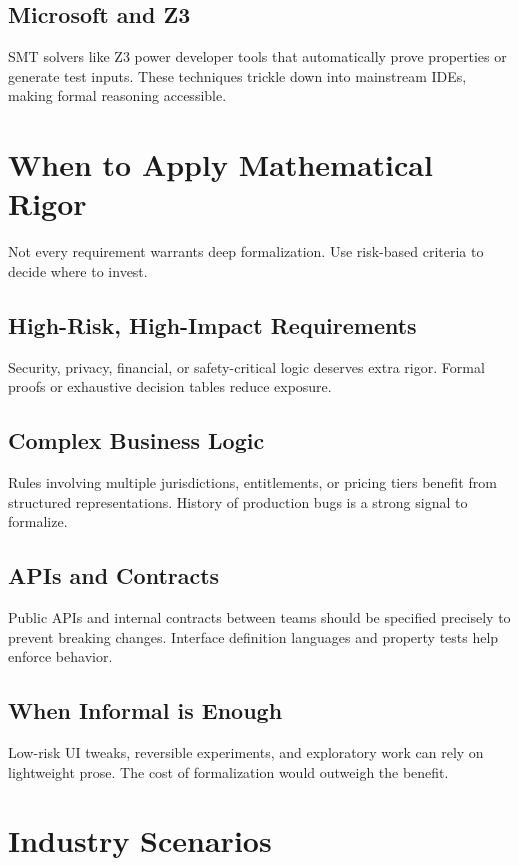 \subsection{Microsoft and Z3}
SMT solvers like Z3 power developer tools that automatically prove properties or generate test inputs. These techniques trickle down into mainstream IDEs, making formal reasoning accessible.

\section{When to Apply Mathematical Rigor}
\label{sec:when-rigor}

Not every requirement warrants deep formalization. Use risk-based criteria to decide where to invest.

\subsection{High-Risk, High-Impact Requirements}
Security, privacy, financial, or safety-critical logic deserves extra rigor. Formal proofs or exhaustive decision tables reduce exposure.

\subsection{Complex Business Logic}
Rules involving multiple jurisdictions, entitlements, or pricing tiers benefit from structured representations. History of production bugs is a strong signal to formalize.

\subsection{APIs and Contracts}
Public APIs and internal contracts between teams should be specified precisely to prevent breaking changes. Interface definition languages and property tests help enforce behavior.

\subsection{When Informal is Enough}
Low-risk UI tweaks, reversible experiments, and exploratory work can rely on lightweight prose. The cost of formalization would outweigh the benefit.

\section{Industry Scenarios}
\label{sec:math-rigor-examples}


